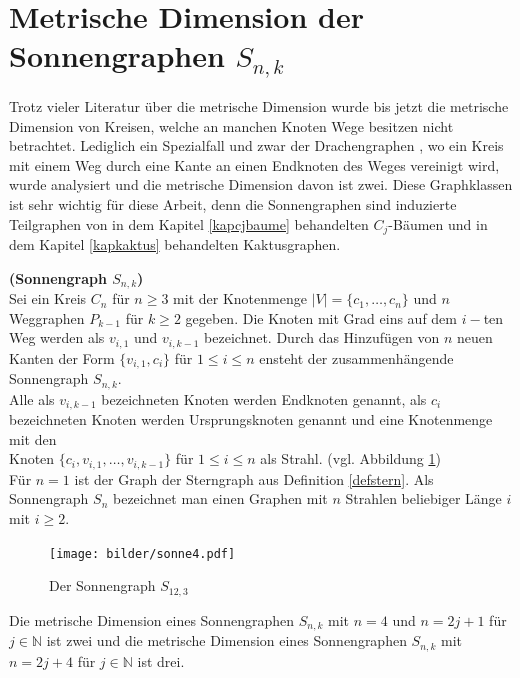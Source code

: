 \section{Metrische Dimension der Sonnengraphen $S_{n,k}$}
Trotz vieler Literatur über die metrische Dimension wurde bis jetzt die metrische Dimension von Kreisen, welche an manchen Knoten Wege besitzen nicht betrachtet. Lediglich ein Spezialfall und zwar der Drachengraphen \cite{blabla}, wo ein Kreis mit einem Weg durch eine Kante an einen Endknoten des Weges vereinigt wird, wurde analysiert und die metrische Dimension davon ist zwei. Diese Graphklassen ist sehr wichtig für diese Arbeit, denn die Sonnengraphen sind induzierte Teilgraphen von in dem Kapitel \ref{kapcjbaume} behandelten $C_j$-Bäumen und in dem Kapitel \ref{kapkaktus} behandelten Kaktusgraphen.
\begin{defi}{\textbf{(Sonnengraph $S_{n,k}$)}}\\
Sei ein Kreis $C_n$ für $n \geq 3$ mit der Knotenmenge $|V|=\{ c_1, \ldots , c_n \}$ und $n$ Weggraphen $P_{k-1}$ für $k \geq 2$ gegeben. Die Knoten mit Grad eins auf dem $i-$ten Weg werden als $v_{i,1}$ und $v_{i,k-1}$ bezeichnet. Durch das Hinzufügen von $n$ neuen Kanten der Form $\{v_{i,1},c_i\}$ für $1 \leq i \leq n$ ensteht der zusammenhängende Sonnengraph $S_{n,k}$.\\
Alle als $v_{i,k-1}$ bezeichneten Knoten werden Endknoten genannt, als $c_i$ bezeichneten Knoten werden Ursprungsknoten genannt und eine Knotenmenge mit den\\Knoten $\{c_i,v_{i,1}, \ldots ,v_{i,k-1}\}$ für $1 \leq i \leq n$ als Strahl. (vgl. Abbildung \ref{bild:sonnengraph})\\
Für $n=1$ ist der Graph der Sterngraph aus Definition \ref{defstern}. Als Sonnengraph $S_n$ bezeichnet man einen Graphen mit $n$ Strahlen beliebiger Länge $i$ mit $i \geq 2$.
\end{defi}
\begin{figure}[h!]
\centering
 		 \texttt{[image: bilder/sonne4.pdf]}
   \caption{Der Sonnengraph $S_{12,3}$}
   \label{bild:sonnengraph}
\end{figure}
\begin{lem}
Die metrische Dimension eines Sonnengraphen $S_{n,k}$ mit $n=4$ und $n = 2j+1$ für $j \in \mathbb{N}$ ist zwei und die metrische Dimension eines Sonnengraphen $S_{n,k}$ mit $n = 2j+4$ für $j \in \mathbb{N}$ ist drei.
\end{lem}
